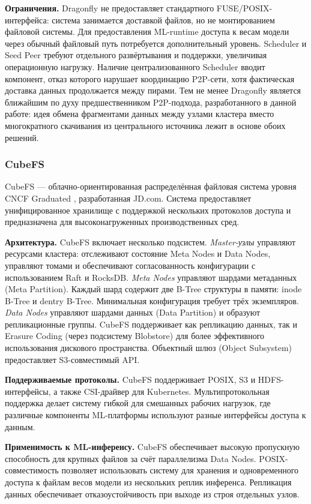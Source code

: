\textbf{Ограничения.} Dragonfly не предоставляет стандартного FUSE/POSIX-интерфейса: система занимается доставкой файлов, но не монтированием файловой системы. Для предоставления ML-runtime доступа к весам модели через обычный файловый путь потребуется дополнительный уровень. Scheduler и Seed Peer требуют отдельного развёртывания и поддержки, увеличивая операционную нагрузку. Наличие централизованного Scheduler вводит компонент, отказ которого нарушает координацию P2P-сети, хотя фактическая доставка данных продолжается между пирами. Тем не менее Dragonfly является ближайшим по духу предшественником P2P-подхода, разработанного в данной работе: идея обмена фрагментами данных между узлами кластера вместо многократного скачивания из центрального источника лежит в основе обоих решений.

\subsubsection*{CubeFS}

CubeFS --- облачно-ориентированная распределённая файловая система уровня CNCF Graduated \cite{cubefs_arch}, разработанная JD.com. Система предоставляет унифицированное хранилище с поддержкой нескольких протоколов доступа и предназначена для высоконагруженных производственных сред.

\textbf{Архитектура.} CubeFS включает несколько подсистем. \textit{Master-узлы} управляют ресурсами кластера: отслеживают состояние Meta Nodes и Data Nodes, управляют томами и обеспечивают согласованность конфигурации с использованием Raft и RocksDB. \textit{Meta Nodes} управляют шардами метаданных (Meta Partition). Каждый шард содержит две B-Tree структуры в памяти: inode B-Tree и dentry B-Tree. Минимальная конфигурация требует трёх экземпляров. \textit{Data Nodes} управляют шардами данных (Data Partition) и образуют репликационные группы. CubeFS поддерживает как репликацию данных, так и Erasure Coding (через подсистему Blobstore) для более эффективного использования дискового пространства. Объектный шлюз (Object Subsystem) предоставляет S3-совместимый API.

\textbf{Поддерживаемые протоколы.} CubeFS поддерживает POSIX, S3 и HDFS-интерфейсы, а также CSI-драйвер для Kubernetes. Мультипротокольная поддержка делает систему гибкой для смешанных рабочих нагрузок, где различные компоненты ML-платформы используют разные интерфейсы доступа к данным.

\textbf{Применимость к ML-инференсу.} CubeFS обеспечивает высокую пропускную способность для крупных файлов за счёт параллелизма Data Nodes. POSIX-совместимость позволяет использовать систему для хранения и одновременного доступа к файлам весов модели из нескольких реплик инференса. Репликация данных обеспечивает отказоустойчивость при выходе из строя отдельных узлов.

